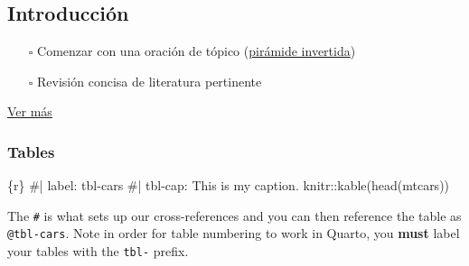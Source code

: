 \documentclass[
]{article}
\newenvironment{Shaded}{\begin{snugshade}}{\end{snugshade}}
\newcommand{\InformationTok}[1]{\textcolor[rgb]{0.37,0.37,0.37}{#1}}
\providecommand{\tightlist}{%
  \setlength{\itemsep}{0pt}\setlength{\parskip}{0pt}}\usepackage{longtable,booktabs,array}
\begin{document}
\subsection{Introducción}\label{introducciuxf3n}

\begin{itemize}
\tightlist
\item[$\square$]
  Comenzar con una oración de tópico
  (\href{https://en.wikipedia.org/wiki/Inverted_pyramid_(journalism)}{pirámide
  invertida})
\item[$\square$]
  Revisión concisa de literatura pertinente
\end{itemize}

\href{https://writingcenter.gmu.edu/writing-resources/imrad/imrad-reports-introductions}{Ver
más}

\subsubsection{Tables}\label{tables}

\begin{Shaded}
\begin{Highlighting}[]
\InformationTok{\textasciigrave{}\textasciigrave{}\textasciigrave{}\{r\}}
\InformationTok{\#| label: tbl{-}cars}
\InformationTok{\#| tbl{-}cap: This is my caption.}
\InformationTok{knitr::kable(head(mtcars))}
\InformationTok{\textasciigrave{}\textasciigrave{}\textasciigrave{}}
\end{Highlighting}
\end{Shaded}

The \texttt{\#\textbar{}} is what sets up our cross-references and you
can then reference the table as \texttt{@tbl-cars}. Note in order for
table numbering to work in Quarto, you \textbf{must} label your tables
with the \texttt{tbl-} prefix.
\end{document}
